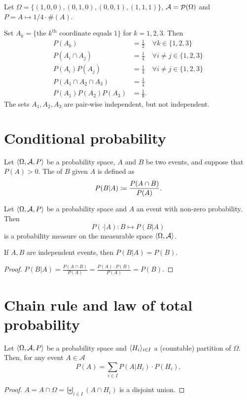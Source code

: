 \begin{example}
Let $\Omega = \{(1, 0, 0), (0, 1, 0), (0, 0, 1), (1, 1, 1)\}$, $\mathcal{A} = \mathop{\mathcal{P}}(\Omega)$ and $P = A\mapsto 1/4 \cdot \#(A)$.

Set $A_k = \{\text{the $k^\text{th}$ coordinate equals $1$}\}$ for $k=1,2,3$. Then
\begin{align*}
P(A_k) &= \frac{1}{2} & \forall k \in\{1,2,3\} \\
P(A_i\cap A_j) &= \frac{1}{4} & \forall i\neq j \in\{1,2,3\} \\
P(A_i)P(A_j) &= \frac{1}{4} & \forall i\neq j \in\{1,2,3\} \\
P(A_1\cap A_2 \cap A_3) &= \frac{1}{4} \\
P(A_1)P(A_2)P(A_3) &= \frac{1}{8}.
\end{align*}
The sets $A_1, A_2, A_3$ are pair-wise independent, but not independent.
\end{example}

\section{Conditional probability}
\begin{definition}
Let $\langle \Omega, \mathcal{A}, P \rangle$ be a probability space, $A$ and $B$ be two events, and suppose that $P(A) > 0$. The  of $B$ given $A$ is defined as
\[ P(B | A) \coloneqq \frac{P(A\cap B)}{P(A)}. \]
\end{definition}
\begin{lemma}
Let $\langle \Omega, \mathcal{A}, P \rangle$ be a probability space and $A$ an event with non-zero probability. Then
\[ P(\cdot | A): B\mapsto P(B | A) \]
is a probability measure on the measurable space $\langle \Omega, \mathcal{A} \rangle$.
\end{lemma}
\begin{lemma}
If $A,B$ are independent events, then $P(B|A) = P(B)$.
\end{lemma}
\begin{proof}
$P(B|A) = \frac{P(A\cap B)}{P(A)} = \frac{P(A)\cdot P(B)}{P(A)} = P(B)$.
\end{proof}

\section{Chain rule and law of total probability}
\begin{theorem}
Let $\langle \Omega, \mathcal{A}, P \rangle$ be a probability space and $\langle H_i \rangle_{i\in I}$ a (countable) partition of $\Omega$. Then, for any event $A\in \mathcal{A}$
\[ P(A) = \sum_{i\in I}P(A|H_i)\cdot P(H_i). \]
\end{theorem}
\begin{proof}
$A = A\cap \Omega = \biguplus_{i\in I}(A\cap H_i)$ is a disjoint union.
\end{proof}

